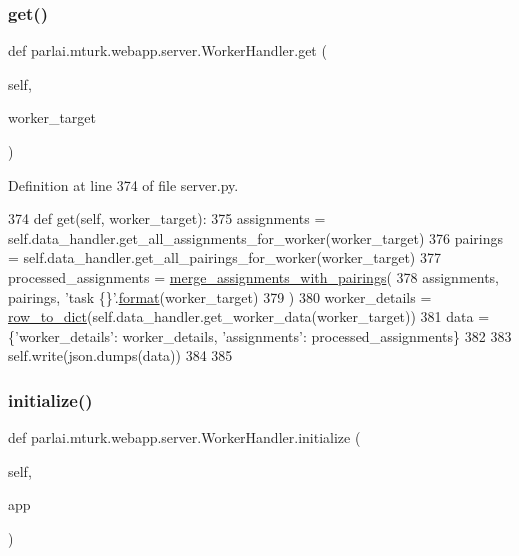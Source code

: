 \subsubsection{\texorpdfstring{get()}{get()}}
{\footnotesize\ttfamily def parlai.\+mturk.\+webapp.\+server.\+Worker\+Handler.\+get (\begin{DoxyParamCaption}\item[{}]{self,  }\item[{}]{worker\+\_\+target }\end{DoxyParamCaption})}



Definition at line 374 of file server.\+py.


\begin{DoxyCode}
374     \textcolor{keyword}{def }get(self, worker\_target):
375         assignments = self.data\_handler.get\_all\_assignments\_for\_worker(worker\_target)
376         pairings = self.data\_handler.get\_all\_pairings\_for\_worker(worker\_target)
377         processed\_assignments = \hyperlink{namespaceparlai_1_1mturk_1_1webapp_1_1server_abe6ddbf97d0e5c26315fa927ed076489}{merge\_assignments\_with\_pairings}(
378             assignments, pairings, \textcolor{stringliteral}{'task \{\}'}.\hyperlink{namespaceparlai_1_1chat__service_1_1services_1_1messenger_1_1shared__utils_a32e2e2022b824fbaf80c747160b52a76}{format}(worker\_target)
379         )
380         worker\_details = \hyperlink{namespaceparlai_1_1mturk_1_1webapp_1_1server_a92be47964fa33a4b6a14d4069d091c7d}{row\_to\_dict}(self.data\_handler.get\_worker\_data(worker\_target))
381         data = \{\textcolor{stringliteral}{'worker\_details'}: worker\_details, \textcolor{stringliteral}{'assignments'}: processed\_assignments\}
382 
383         self.write(json.dumps(data))
384 
385 
\end{DoxyCode}
\mbox{\label{classparlai_1_1mturk_1_1webapp_1_1server_1_1WorkerHandler_a6e358648dc6628021fe6384d2741c2cc}} 
\subsubsection{\texorpdfstring{initialize()}{initialize()}}
{\footnotesize\ttfamily def parlai.\+mturk.\+webapp.\+server.\+Worker\+Handler.\+initialize (\begin{DoxyParamCaption}\item[{}]{self,  }\item[{}]{app }\end{DoxyParamCaption})}



